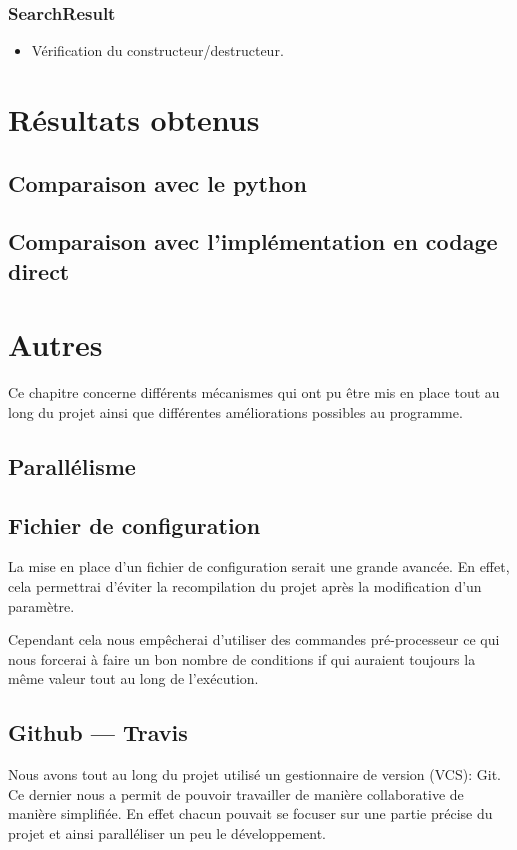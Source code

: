 \documentclass[hideweeklyreports]{polytech/polytech}
\begin{document}
			\subsection{SearchResult}
				\begin{itemize}
					\item Vérification du constructeur/destructeur.
				\end{itemize}
		
	\chapter{Résultats obtenus}
		\section{Comparaison avec le python} %
		\section{Comparaison avec l'implémentation en codage direct} %
	
	\chapter{Autres}
		Ce chapitre concerne différents mécanismes qui ont pu être mis en place tout au long du projet ainsi que différentes améliorations possibles au programme.
		
		\section{Parallélisme} %
		
		\section{Fichier de configuration}
			La mise en place d'un fichier de configuration serait une grande avancée. En effet, cela permettrai d'éviter la recompilation du projet après la modification d'un paramètre.
			
			Cependant cela nous empêcherai d'utiliser des commandes pré-processeur ce qui nous forcerai à faire un bon nombre de conditions if qui auraient toujours la même valeur tout au long de l'exécution.
		
		\section{Github — Travis}
			Nous avons tout au long du projet utilisé un gestionnaire de version (VCS): Git. Ce dernier nous a permit de pouvoir travailler de manière collaborative de manière simplifiée. En effet chacun pouvait se focuser sur une partie précise du projet et ainsi paralléliser un peu le développement.
			
\end{document}
